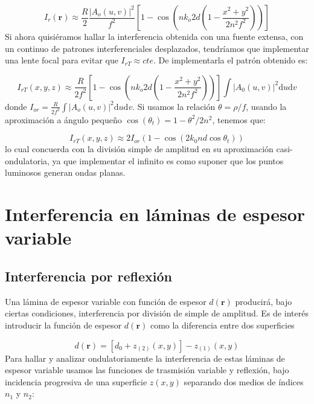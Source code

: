\documentclass[12pt,a4paper]{book}
\numberwithin{equation}{section}
\numberwithin{figure}{section}
\newcommand{\parentesis}[1]{\left( #1  \right)}
\newcommand{\ccorchetes}[1]{\left[ #1  \right]}
\newcommand{\D}{\mathrm{d}}
\newcommand{\1}{_{(1)}}
\newcommand{\2}{_{(2)}}
\newcommand{\rn}{\mathbf{r}}
\theoremstyle{definition}
\begin{document}
\begin{equation}
I_r(\rn) \approx \frac{R}{2} \frac{|A_o (u,v)|^2}{f^2} \ccorchetes{1- \cos \parentesis{nk_o 2d \parentesis{1-\frac{x^2+y^2}{2n^2f^2}}}}
\end{equation}
Si ahora quisiéramos hallar la interferencia obtenida con una fuente extensa, con un continuo de patrones interferenciales desplazados, tendríamos que implementar una lente focal para evitar que $I_{rT} \approx cte$. De implementarla el patrón obtenido es:

\begin{equation}
I_{rT} (x,y,z) \approx \frac{R}{2f^2} \ccorchetes{1- \cos \parentesis{nk_o 2d \parentesis{1-\frac{x^2+y^2}{2n^2f^2}}}}\int |A_0 (u,v)|^2 \D u \D v 
\end{equation}
donde $I_{or} = \frac{R}{2f^2} \int |A_o(u,v)|^2 \D u \D v$. Si usamos la relación $\theta=\rho/f$, usando la aproximación a ángulo pequeño $\cos(\theta_t) = 1 - \theta^2/2n^2$, tenemos que:

\begin{equation}
I_{rT}(x,y,z) \approx 2 I_{or}(1-\cos (2k_0 n d \cos\theta_t))
\end{equation}
lo cual concuerda con la división simple de amplitud en su aproximación casi-ondulatoria, ya que implementar el infinito es como suponer que los puntos luminosos generan ondas planas. 

\section{Interferencia en láminas de espesor variable}

\subsection{Interferencia por reflexión}

Una lámina de espesor variable con función de espesor $d(\rn)$ producirá, bajo ciertas condiciones, interferencia por división de simple de amplitud. Es de interés introducir la función de espesor $d(\rn)$ como la diferencia entre dos superficies 

\begin{equation}
d(\rn)=[d_0 +z_{(2)}(x,y)]-z_{(1)} (x,y)
\end{equation}
Para hallar y analizar ondulatoriamente la interferencia de estas láminas de espesor variable usamos las funciones de trasmisión variable y reflexión, bajo incidencia progresiva de una superficie $z(x,y)$ separando dos medios de índices $n_1$ y $n_2$:
\end{document}
